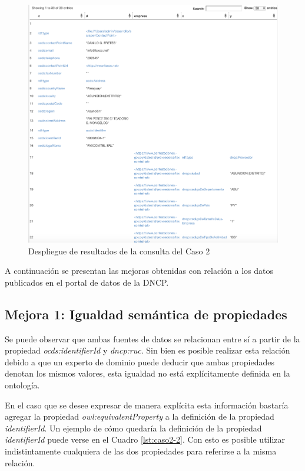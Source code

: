  \begin{figure}[ht!]
    \centering
    \includegraphics[width=150mm]{figuras/caso2Resultado.png}
    \caption{Despliegue de resultados de la consulta del Caso 2}
    \label{img:caso2Resultado}
 \end{figure}



A continuación se presentan las mejoras obtenidas con relación a los datos publicados en el portal de datos de la DNCP.
 
 \subsection{Mejora 1: Igualdad semántica de propiedades}
 Se puede observar que ambas fuentes de datos se relacionan entre sí a partir de la propiedad \textit{ocds:identifierId} y \textit{dncp:ruc}. Sin bien es posible realizar esta relación debido a que un experto de dominio puede deducir que ambas propiedades denotan los mismos valores, esta igualdad no está explícitamente definida en la ontología. 
 
 En el caso que se desee expresar de manera explícita esta información bastaría agregar la propiedad \textit{owl:equivalentProperty}  a la definición de la propiedad \textit{identifierId}. Un ejemplo de cómo quedaría la definición de la propiedad \textit{identifierId} puede verse en el Cuadro \ref{lst:caso2-2}. Con esto es posible utilizar indistintamente cualquiera de las dos propiedades para referirse a la misma relación.\hfill \break

